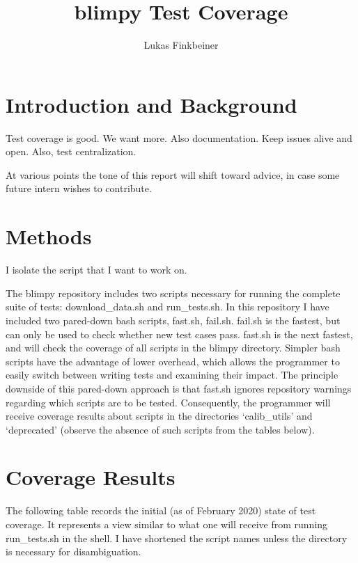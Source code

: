 \documentclass[12pt]{article}
\title{blimpy Test Coverage}
\author{Lukas Finkbeiner}
\begin{document}
\maketitle


\section{Introduction and Background}

\quad \quad Test coverage is good. We want more. Also documentation. Keep issues alive and open. Also, test centralization.

At various points the tone of this report will shift toward advice, in case some future intern wishes to contribute.

\section{Methods}

\quad \quad I isolate the script that I want to work on.

The blimpy repository includes two scripts necessary for running the complete suite of tests: download\_data.sh and run\_tests.sh. In this repository I have included two pared-down bash scripts, fast.sh, fail.sh. fail.sh is the fastest, but can only be used to check whether new test cases pass. fast.sh is the next fastest, and will check the coverage of all scripts in the blimpy directory. Simpler bash scripts have the advantage of lower overhead, which allows the programmer to easily switch between writing tests and examining their impact. The principle downside of this pared-down approach is that fast.sh ignores repository warnings regarding which scripts are to be tested. Consequently, the programmer will receive coverage results about scripts in the directories `calib\_utils' and `deprecated' (observe the absence of such scripts from the tables below). 

\section{Coverage Results}

\quad \quad The following table records the initial (as of February 2020) state of test coverage. It represents a view similar to what one will receive from running run\_tests.sh in the shell. I have shortened the script names unless the directory is necessary for disambiguation.
\end{document}
